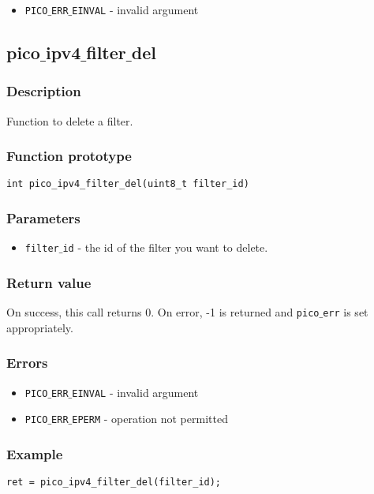 \begin{itemize}[noitemsep]
\item \texttt{PICO$\_$ERR$\_$EINVAL} - invalid argument
\end{itemize}


\subsection{pico$\_$ipv4$\_$filter$\_$del}

\subsubsection*{Description}
Function to delete a filter.

\subsubsection*{Function prototype}
\begin{verbatim}
int pico_ipv4_filter_del(uint8_t filter_id)
\end{verbatim}

\subsubsection*{Parameters}
\begin{itemize}[noitemsep]
\item \texttt{filter$\_$id} - the id of the filter you want to delete.
\end{itemize}

\subsubsection*{Return value}
On success, this call returns 0.
On error, -1 is returned and \texttt{pico$\_$err} is set appropriately.

\subsubsection*{Errors}

\begin{itemize}[noitemsep]
\item \texttt{PICO$\_$ERR$\_$EINVAL} - invalid argument
\item \texttt{PICO$\_$ERR$\_$EPERM} - operation not permitted
\end{itemize}

\subsubsection*{Example}
\begin{verbatim}
ret = pico_ipv4_filter_del(filter_id);
\end{verbatim}


